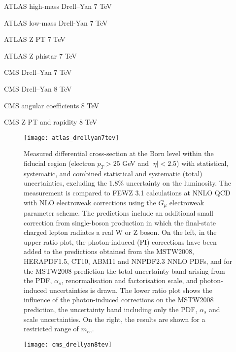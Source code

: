 ATLAS high-mass Drell--Yan 7 TeV~\cite{Aad:2013iua} 

ATLAS low-mass Drell-Yan 7 TeV~\cite{Aad:2014qja}

ATLAS Z PT 7 TeV~\cite{Aad:2014xaa}

ATLAS Z phistar 7 TeV~\cite{Aad:2012wfa}

CMS Drell--Yan 7 TeV~\cite{Chatrchyan:2013tia}

CMS Drell--Yan 8 TeV~\cite{CMS:2014jea}

CMS angular coefficients 8 TeV~\cite{Khachatryan:2015paa}

CMS Z PT and rapidity 8 TeV~\cite{Khachatryan:2015oaa}

\begin{figure}[p]
    \centering
    \texttt{[image: atlas\_drellyan7tev]}
    \caption{Measured differential cross-section at the Born level within the fiducial region (electron $p_T > 25$ GeV and $|\eta| < 2.5$) with statistical, systematic, and combined statistical and systematic (total) uncertainties, excluding the 1.8\% uncertainty on the luminosity. The measurement is compared to FEWZ 3.1 calculations at NNLO QCD with NLO electroweak corrections using the $G_{\mu}$ electroweak parameter scheme. The predictions include an additional small correction from single-boson production in which the final-state charged lepton radiates a real W or Z boson. On the left, in the upper ratio plot, the photon-induced (PI) corrections have been added to the predictions obtained from the MSTW2008, HERAPDF1.5, CT10, ABM11 and NNPDF2.3 NNLO PDFs, and for the MSTW2008 prediction the total uncertainty band arising from the PDF, $\alpha_s$, renormalisation and factorisation scale, and photon-induced uncertainties is drawn. The lower ratio plot shows the influence of the photon-induced corrections on the MSTW2008 prediction, the uncertainty band including only the PDF, $\alpha_s$ and scale uncertainties. On the right, the results are shown for a restricted range of $m_{ee}$.}
    \label{fig:atlas_drellyan7tev}
\end{figure}

\begin{figure}[p]
    \centering
    \texttt{[image: cms\_drellyan8tev]}
    \caption{}
    \label{fig:cms_drellyan8tev}
\end{figure}

